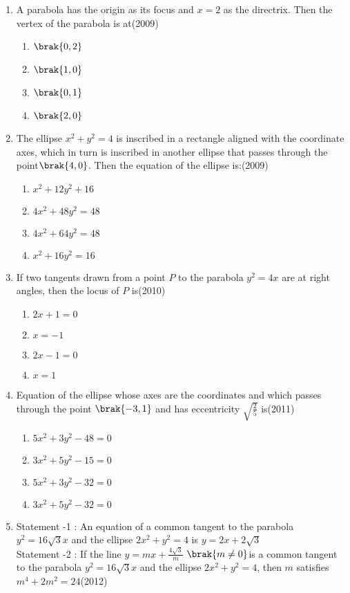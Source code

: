 \documentclass[journal,12pt,twocolumn]{IEEEtran}
\theoremstyle{remark}
\begin{document}
\begin{enumerate}
\item A parabola has the origin as its focus and $x=2$ as the directrix. Then the vertex of the parabola is at\hfill(2009)
\begin{enumerate}
    \item $\brak{0,2}$
    \item $\brak{1,0}$
    \item $\brak{0,1}$
    \item $\brak{2,0}$
\end{enumerate}
\item The ellipse $x^2+y^2 = 4$ is inscribed in a rectangle aligned with the coordinate axes, which in turn is inscribed in another ellipse that passes through the point$\brak{4,0}$. Then the equation of the ellipse is:\hfill(2009)
\begin{enumerate}
    \item $x^2+12y^2+16$
    \item $4x^2+48y^2=48$
    \item $4x^2+64y^2=48$
    \item $x^2+16y^2=16$
\end{enumerate}
\item If two tangents drawn from a point $P$ to the parabola $y^2=4x$ are at right angles, then the locus of $P$ is\hfill(2010)
\begin{enumerate}
    \item $2x+1=0$
    \item $x=-1$
    \item $2x-1=0$
    \item $x=1$
\end{enumerate}
\item Equation of the ellipse whose axes are the coordinates and which passes through the point $\brak{-3,1}$ and has eccentricity $\sqrt{\frac{2}{5}}$ is\hfill(2011)
\begin{enumerate}
    \item $5x^2+3y^2-48=0$
    \item $3x^2+5y^2-15=0$
    \item $5x^2+3y^2-32=0$
    \item $3x^2+5y^2-32=0$
\end{enumerate}
\item Statement -1 : An equation of a common tangent to the  parabola $y^2=16\sqrt{3}x$ and the ellipse $2x^2+y^2=4$ is $y=2x+2\sqrt{3}$\\
Statement -2 : If the line $y=mx+\frac{4\sqrt{3}}{m}$ $\brak{m \neq 0}$is a common tangent to the parabola $y^2=16\sqrt{3}x$ and the ellipse $2x^2+y^2=4$, then $m$ satisfies $m^4+2m^2=24$\hfill(2012)

\end{enumerate}
\end{document}
